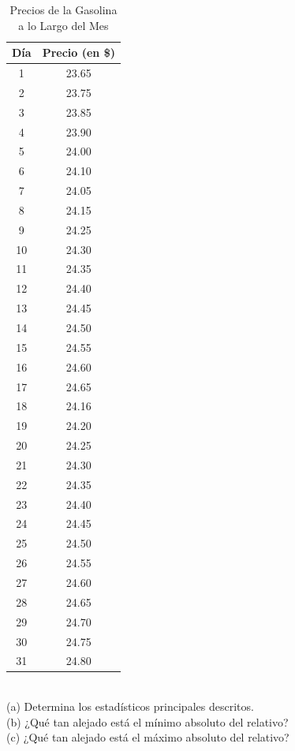 \documentclass{article}
\begin{document}
\begin{table}[ht]
    \centering
    \caption{Precios de la Gasolina a lo Largo del Mes}
    \begin{tabular}{|c|c|}
        \hline
        \textbf{Día} & \textbf{Precio (en \$)} \\
        \hline
        1 & 23.65 \\
        2 & 23.75 \\
        3 & 23.85 \\
        4 & 23.90 \\
        5 & 24.00 \\
        6 & 24.10 \\
        7 & 24.05 \\
        8 & 24.15 \\
        9 & 24.25 \\
        10 & 24.30 \\
        11 & 24.35 \\
        12 & 24.40 \\
        13 & 24.45 \\
        14 & 24.50 \\
        15 & 24.55 \\
        16 & 24.60 \\
        17 & 24.65 \\
        18 & 24.16 \\
        19 & 24.20 \\
        20 & 24.25 \\
        21 & 24.30 \\
        22 & 24.35 \\
        23 & 24.40 \\
        24 & 24.45 \\
        25 & 24.50 \\
        26 & 24.55 \\
        27 & 24.60 \\
        28 & 24.65 \\
        29 & 24.70 \\
        30 & 24.75 \\
        31 & 24.80 \\
        \hline
    \end{tabular}
\end{table}
\\
(a) Determina los estadísticos principales descritos.
\\[6pt]
(b) ¿Qué tan alejado está el mínimo absoluto del relativo?
\\[6pt]
(c) ¿Qué tan alejado está el máximo absoluto del relativo?
\end{document}
